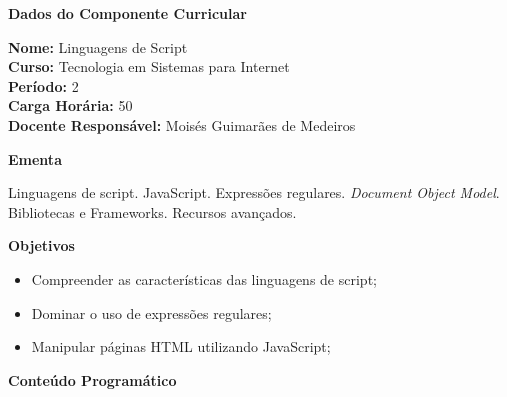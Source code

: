 

\begin{snugshade}\begin{center}\textbf{
    Dados do Componente Curricular
}\end{center}\end{snugshade}

\noindent \textbf{Nome:}                Linguagens de Script
\\        \textbf{Curso:}               Tecnologia em Sistemas para Internet
\\        \textbf{Período:}             \unit{2}{\degree}
\\        \textbf{Carga Horária:}       \unit{50}{\hour}
\\        \textbf{Docente Responsável:} Moisés Guimarães de Medeiros


\begin{snugshade}\begin{center}\textbf{
    Ementa
\vphantom{q}}\end{center}\end{snugshade}

\noindent
Linguagens de script. JavaScript. Expressões regulares. \textit{Document Object Model}. Bibliotecas e Frameworks. Recursos avançados.


\begin{snugshade}\begin{center}\textbf{
    Objetivos
}\end{center}\end{snugshade}

\begin{itemize}

\item Compreender as características das linguagens de script;

\item Dominar o uso de expressões regulares;

\item Manipular páginas HTML utilizando JavaScript;

\end{itemize}


\begin{snugshade}\begin{center}\textbf{
    Conteúdo Programático
}\end{center}\end{snugshade}

